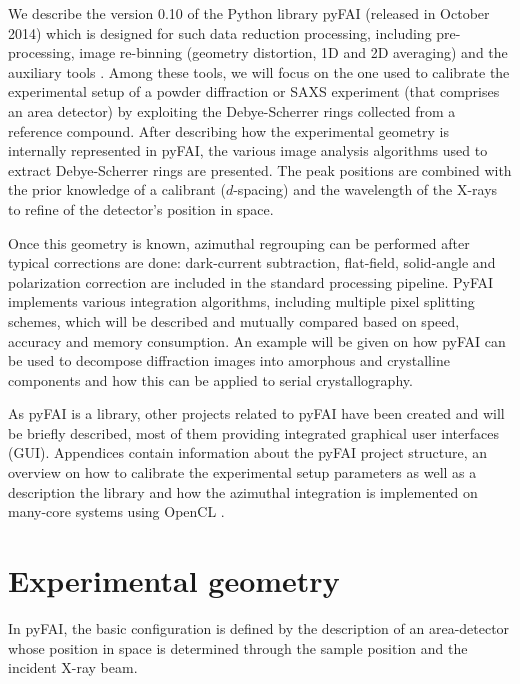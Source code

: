 \documentclass{iucr}
\begin{document}
We describe the version 0.10 of the Python library pyFAI 
(released in October 2014) which is designed for such data reduction processing,
including pre-processing, image re-binning (geometry distortion, 1D and 2D
averaging) and the auxiliary tools \cite{pyfai}. 
Among these tools, we will focus on the one used to
calibrate the experimental setup of a powder diffraction  
or SAXS experiment (that comprises
an area detector) by exploiting the Debye-Scherrer rings collected from a
reference compound.
After describing how the experimental geometry is internally represented in
pyFAI, the various image analysis algorithms used to extract Debye-Scherrer
rings are presented.
The peak positions are combined with the prior knowledge of a calibrant
($d$-spacing) and the wavelength of the X-rays  to refine of the
detector's position in space.

Once this geometry is known, azimuthal regrouping can be performed after
typical corrections are done: dark-current subtraction, flat-field,
solid-angle and polarization correction are included in the standard processing
pipeline.
PyFAI implements various integration algorithms, including
multiple pixel splitting schemes, which will be described and mutually compared
based on speed, accuracy and memory consumption.
An example will be given on how pyFAI can be used to decompose
diffraction images into amorphous and crystalline components and how this can be
applied to serial crystallography.

As pyFAI is a library, other projects related to pyFAI have been created and
will be briefly described, most of them providing integrated
graphical user interfaces (GUI).
Appendices contain information about the pyFAI project structure, an
overview on how to calibrate the experimental setup parameters as well as
a description the library and how the azimuthal integration is implemented on
many-core systems using OpenCL \cite{opencl}.

\section{Experimental geometry}

In pyFAI, the basic configuration is defined by the description of an
area-detector whose position in space is determined through the sample
position and the incident X-ray beam.
\end{document}
